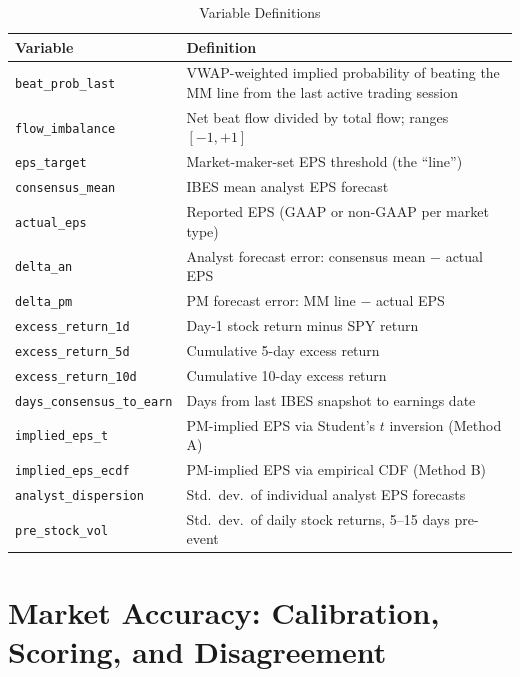 \documentclass[11pt]{article}
\begin{document}
\begin{table}[htbp]
\centering
\begin{threeparttable}
\caption{Variable Definitions}
\label{tab:variables}
\begin{tabular}{lp{4.2in}}
\toprule
Variable & Definition \\
\midrule
\texttt{beat\_prob\_last} & VWAP-weighted implied probability of beating the MM line from the last active trading session \\
\texttt{flow\_imbalance} & Net beat flow divided by total flow; ranges $[-1, +1]$ \\
\texttt{eps\_target} & Market-maker-set EPS threshold (the ``line'') \\
\texttt{consensus\_mean} & IBES mean analyst EPS forecast \\
\texttt{actual\_eps} & Reported EPS (GAAP or non-GAAP per market type) \\
\texttt{delta\_an} & Analyst forecast error: consensus mean $-$ actual EPS \\
\texttt{delta\_pm} & PM forecast error: MM line $-$ actual EPS \\
\texttt{excess\_return\_1d} & Day-1 stock return minus SPY return \\
\texttt{excess\_return\_5d} & Cumulative 5-day excess return \\
\texttt{excess\_return\_10d} & Cumulative 10-day excess return \\
\texttt{days\_consensus\_to\_earn} & Days from last IBES snapshot to earnings date \\
\texttt{implied\_eps\_t} & PM-implied EPS via Student's $t$ inversion (Method A) \\
\texttt{implied\_eps\_ecdf} & PM-implied EPS via empirical CDF (Method B) \\
\texttt{analyst\_dispersion} & Std.\ dev.\ of individual analyst EPS forecasts \\
\texttt{pre\_stock\_vol} & Std.\ dev.\ of daily stock returns, 5--15 days pre-event \\
\bottomrule
\end{tabular}
\end{threeparttable}
\end{table}

\section{Market Accuracy: Calibration, Scoring, and Disagreement} \label{sec:accuracy}
\end{document}

